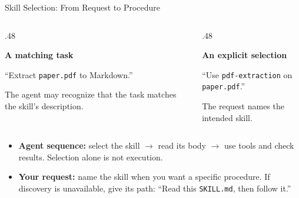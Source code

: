 \begin{frame}{Skill Selection: From Request to Procedure}
\small
{}\par\smallskip
\begin{columns}[T,onlytextwidth]
\begin{column}{.48\textwidth}
\begin{conceptbox}\raggedright \textbf{A matching task}\par\medskip
``Extract \texttt{paper.pdf} to Markdown.''
\par\medskip
The agent may recognize that the task matches the skill's description.
\end{conceptbox}
\end{column}
\begin{column}{.48\textwidth}
\begin{conceptbox}\raggedright \textbf{An explicit selection}\par\medskip
``Use \texttt{pdf-extraction} on \texttt{paper.pdf}.''
\par\medskip
The request names the intended skill.
\end{conceptbox}
\end{column}
\end{columns}
\par\medskip
\begin{itemize}
\item \textbf{Agent sequence:} select the skill $\rightarrow$ read its body $\rightarrow$ use tools and check results. Selection alone is not execution.
\item \textbf{Your request:} name the skill when you want a specific procedure. If discovery is unavailable, give its path: ``Read this \texttt{SKILL.md}, then follow it.''
\end{itemize}
\end{frame}

